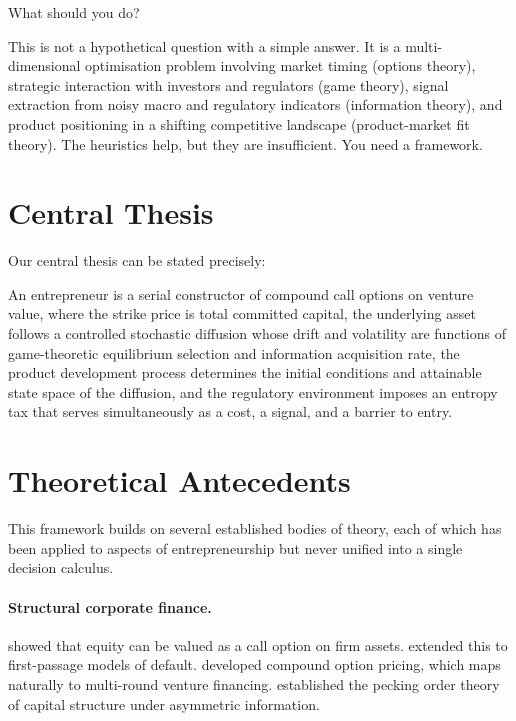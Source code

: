 \documentclass[12pt,a4paper,oneside]{book}
\theoremstyle{definition}
\theoremstyle{remark}
\begin{document}
What should you do?

This is not a hypothetical question with a simple answer. It is a multi-dimensional
optimisation problem involving market timing (options theory), strategic interaction with
investors and regulators (game theory), signal extraction from noisy macro and regulatory
indicators (information theory), and product positioning in a shifting competitive
landscape (product-market fit theory). The heuristics help, but they are insufficient.
You need a framework.

\section{Central Thesis}

Our central thesis can be stated precisely:

\begin{keyinsight}
An entrepreneur is a serial constructor of compound call options on venture value,
where the strike price is total committed capital, the underlying asset follows a
controlled stochastic diffusion whose drift and volatility are functions of
game-theoretic equilibrium selection and information acquisition rate, the product
development process determines the initial conditions and attainable state space of the
diffusion, and the regulatory environment imposes an entropy tax that serves
simultaneously as a cost, a signal, and a barrier to entry.
\end{keyinsight}

\section{Theoretical Antecedents}

This framework builds on several established bodies of theory, each of which has been
applied to aspects of entrepreneurship but never unified into a single decision calculus.

\paragraph{Structural corporate finance.} \citet{Merton1974} showed that equity can be
valued as a call option on firm assets. \citet{BlackCox1976} extended this to first-passage
models of default. \citet{Geske1979} developed compound option pricing, which maps
naturally to multi-round venture financing. \citet{MyersMajluf1984} established the
pecking order theory of capital structure under asymmetric information.
\end{document}
